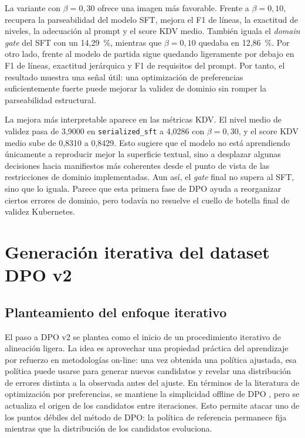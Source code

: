 La variante con \(\beta=0{,}30\) ofrece una imagen más favorable. Frente a
\(\beta=0{,}10\), recupera la parseabilidad del modelo SFT, mejora el F1 de líneas, la exactitud de
niveles, la adecuación al prompt y el score KDV medio. También iguala el \textit{domain gate} del SFT
con un 14,29~\%, mientras que \(\beta=0{,}10\) quedaba en 12,86~\%. Por otro lado, frente al modelo de
partida sigue quedando ligeramente por debajo en F1 de líneas, exactitud jerárquica y F1 de requisitos
del prompt. Por tanto, el resultado muestra una señal útil: una
optimización de preferencias suficientemente fuerte puede mejorar la validez de dominio sin romper la
parseabilidad estructural.

La mejora más interpretable aparece en las métricas KDV. El nivel medio de validez pasa de 3,9000 en
\texttt{serialized\_sft} a 4,0286 con \(\beta=0{,}30\), y el score KDV medio sube de 0,8310 a 0,8429.
Esto sugiere que el modelo no está aprendiendo únicamente a reproducir mejor la superficie textual,
sino a desplazar algunas decisiones hacia manifiestos más coherentes desde el punto de vista de las
restricciones de dominio implementadas. Aun así, el \textit{gate} final no supera al SFT, sino que lo
iguala. Parece que esta primera fase de DPO ayuda a reorganizar ciertos errores de
dominio, pero todavía no resuelve el cuello de botella final de validez Kubernetes.

\section{Generación iterativa del dataset DPO v2}
\label{sec:ch7_dpo_v2_generation}

\subsection{Planteamiento del enfoque iterativo}

El paso a DPO v2 se plantea como el inicio de un procedimiento iterativo de alineación ligera. La
idea es aprovechar una propiedad práctica del aprendizaje por refuerzo en metodologías on-line: una vez obtenida una política ajustada,
esa política puede usarse para generar nuevos candidatos y revelar una distribución de errores
distinta a la observada antes del ajuste. En términos de la literatura de optimización por
preferencias, se mantiene la simplicidad offline de DPO \citep{rafailov2023dpo}, pero se actualiza el
origen de los candidatos entre iteraciones. Esto permite atacar uno de los puntos débiles del método de DPO: la política de referencia permanece 
fija mientras que la distribución de los candidatos evoluciona.


